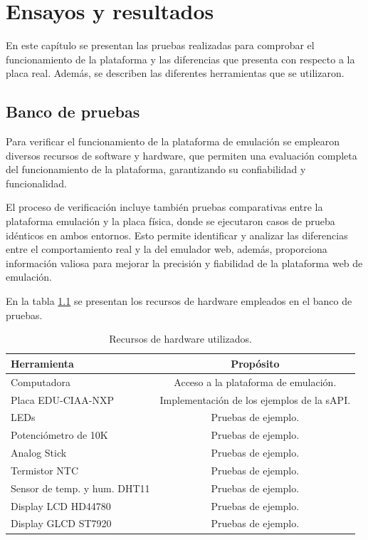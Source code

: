 
\chapter{Ensayos y resultados} %
\label{Chapter4} %

En este capítulo se presentan las pruebas realizadas para comprobar el funcionamiento de la plataforma y las diferencias que presenta con respecto a la placa real. Además, se describen las diferentes herramientas que se utilizaron.

\section{Banco de pruebas}

Para verificar el funcionamiento de la plataforma de emulación se emplearon diversos recursos de software y hardware, que permiten una evaluación completa del funcionamiento de la plataforma, garantizando su confiabilidad y funcionalidad. 

El proceso de verificación incluye también pruebas comparativas entre la plataforma  emulación y la placa física, donde se ejecutaron casos de prueba idénticos en ambos entornos. Esto permite identificar y analizar las diferencias entre el comportamiento real y la del emulador web, además, proporciona información valiosa para mejorar la precisión y fiabilidad de la plataforma web de emulación.

En la tabla \ref{tab:RecursosHardware} se presentan los recursos de hardware empleados en el banco de pruebas.

\begin{table}[h]
	\centering
	\caption[Recursos de hardware utilizados]{Recursos de hardware utilizados.}
	\begin{tabular}{l c}    
		\toprule
		\textbf{Herramienta} & \textbf{Propósito}\\
		\midrule
		Computadora & Acceso a la plataforma de emulación.\\		
		Placa EDU-CIAA-NXP &  Implementación de los ejemplos de la sAPI.\\
		LEDs  &  Pruebas de ejemplo.\\
		Potenciómetro de 10K  &  Pruebas de ejemplo.\\
		Analog Stick  &  Pruebas de ejemplo.\\
		Termistor NTC  &  Pruebas de ejemplo.\\
		Sensor de temp. y hum. DHT11 &  Pruebas de ejemplo.\\
		Display LCD HD44780 &  Pruebas de ejemplo.\\
		Display GLCD ST7920 &  Pruebas de ejemplo.\\
		\bottomrule
		\hline
	\end{tabular}
	\label{tab:RecursosHardware}
\end{table}

